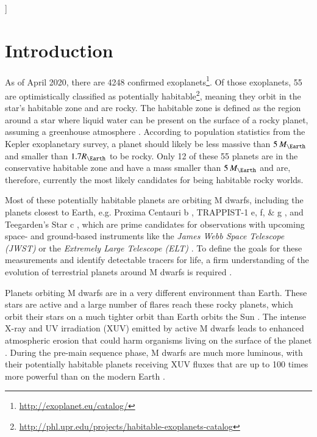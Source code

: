\documentclass[oneside,twocolumn]{article}
\newcommand{\eg}{e.g. }
\begin{document}
\begin{@twocolumnfalse}
\begin{abstract}
\end{abstract}
\end{@twocolumnfalse}
]

\section{Introduction}
As of April 2020, there are 4248 confirmed exoplanets\footnote{\url{http://exoplanet.eu/catalog/}}.
Of those exoplanets, 55 are optimistically classified as potentially habitable\footnote{\url{http://phl.upr.edu/projects/habitable-exoplanets-catalog}}, meaning they orbit in the star's habitable zone and are rocky. The habitable zone is defined as the region around a star where liquid water can be present on the surface of a rocky planet, assuming a greenhouse atmosphere \citep{Huang1959, Kasting1993, Kopparapu2013}. According to population statistics from the Kepler exoplanetary survey, a planet should likely be less massive than $5 \, M_\Earth$ \citep{Otegi2020} and smaller than $1.7 R_{\Earth}$ \citep[\eg][]{Ginzburg2018} to be rocky.
Only 12 of these 55 planets are in the conservative habitable zone and have a mass smaller than $5 \, M_\Earth$ and are, therefore, currently the most likely candidates for being habitable rocky worlds.

Most of these potentially habitable planets are orbiting M dwarfs, including the planets closest to Earth, \eg Proxima Centauri b \citep{Anglada-Escude2016}, TRAPPIST-1 e, f, \& g \citep{Gillon2016}, and Teegarden's Star c \citep{Zechmeister2019}, which are prime candidates for observations with upcoming space- and ground-based instruments like the \textit{James Webb Space Telescope (JWST)} \citep{Barstow2016, Snellen2017, Lincowski2018} or the \textit{Extremely Large Telescope (ELT)} \citep{Snellen2015, Meadows2017}.
To define the goals for these measurements and identify detectable tracers for life, a firm understanding of the evolution of terrestrial planets around M dwarfs is required \citep{Meadows2017b, Catling2018}.

Planets orbiting M dwarfs are in a very different environment than Earth.
These stars are active and a large number of flares reach these rocky planets, which orbit their stars on a much tighter orbit than Earth orbits the Sun \citep{Vida2017a, Gunther2020}. The intense X-ray and UV irradiation (XUV) emitted by active M dwarfs leads to enhanced atmospheric erosion \citep{Watson1981, Lammer2003, Lammer2009, Erkaev2007, Owen2012} that could harm organisms living on the surface of the planet \citep{Lammer2007}.
During the pre-main sequence phase, M dwarfs are much more luminous, with their potentially habitable planets receiving XUV fluxes that are up to 100 times more powerful than on the modern Earth \citep{Lammer2007}.
\end{document}
